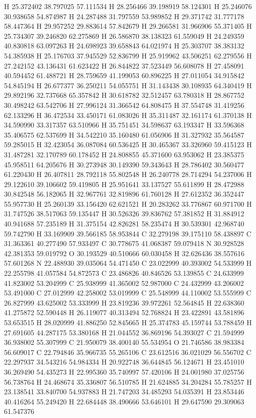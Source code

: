 \documentclass{article}
\begin{document}
H 25.372402 38.797025 57.111534 
H 28.256466 39.198919 58.124301 
H 25.246076 30.938658 54.874987 
H 24.287488 31.797559 53.989852 
H 29.371742 31.777178 58.447364 
H 29.957252 29.883614 57.842679 
H 29.266581 31.966906 55.371405 
H 25.734307 39.246820 62.275869 
H 26.586870 38.138323 61.559049 
H 24.249359 40.830818 63.097263 
H 24.698923 39.658843 64.021974 
H 25.303707 38.383132 54.385938 
H 25.176703 37.945529 52.836799 
H 25.919962 43.506251 62.279556 
H 27.242152 43.136431 61.623422 
H 26.844822 37.523449 56.608078 
H 27.458091 40.594452 61.488721 
H 28.759659 41.199053 60.896225 
H 27.011054 34.915842 54.845194 
H 26.677377 36.250211 54.055751 
H 31.143438 30.108935 64.340419 
H 29.892196 32.737668 65.357842 
H 30.618782 32.512457 63.780318 
H 28.867752 30.498242 63.542706 
H 27.996124 31.366542 64.808475 
H 37.554748 31.419256 62.133296 
H 36.472534 33.450171 61.083026 
H 35.311487 32.161174 61.370138 
H 34.590990 33.317357 63.510966 
H 35.751451 34.598637 63.193347 
H 33.596368 35.406575 62.537699 
H 34.542210 35.160480 61.056906 
H 31.327932 35.564587 59.285015 
H 32.423054 36.087084 60.536425 
H 30.465367 33.326960 59.415123 
H 31.487281 32.170789 60.178452 
H 24.808855 45.371600 63.953062 
H 23.385375 45.958511 64.205676 
H 30.273948 30.149390 59.343643 
H 28.786402 30.560477 61.220430 
H 26.407811 28.792118 55.802548 
H 26.240778 28.714294 54.237006 
H 29.122610 39.106602 59.419805 
H 25.951641 33.137527 55.611899 
H 28.472988 30.842548 56.182065 
H 32.967761 32.819896 61.760128 
H 27.612352 36.352447 55.957730 
H 25.260139 33.156420 62.621521 
H 20.283262 33.776867 60.971700 
H 31.747526 38.517063 59.135447 
H 30.526326 39.836762 57.381852 
H 31.884912 40.941688 57.235189 
H 31.375154 42.826281 58.235474 
H 30.539301 42.968740 59.742790 
H 33.169909 39.566185 58.953844 
C 32.279198 39.175110 58.438897 
C 31.363361 40.277490 57.933497 
C 30.778675 41.068387 59.079418 
N 30.928528 42.381353 59.019792 
O 30.193529 40.510666 60.030458 
H 32.626436 38.557616 57.601268 
N 22.488930 39.035064 54.471450 
C 23.022999 40.393002 54.533999 
H 22.255798 41.057584 54.872573 
C 23.486826 40.846526 53.139855 
C 24.633999 41.823002 53.204999 
C 25.938999 41.365002 52.987000 
C 24.432999 43.206002 53.491000 
C 27.012999 42.258002 53.019999 
C 25.548999 44.110002 53.555999 
C 26.827999 43.625002 53.333999 
H 23.819236 39.972261 52.564845 
H 22.638360 41.275872 52.590448 
H 26.119077 40.313494 52.768824 
H 23.422891 43.581896 53.653515 
H 28.020999 41.886250 52.845665 
H 25.374783 45.159744 53.788459 
H 27.691605 44.287175 53.380168 
H 21.044552 36.869196 54.393027 
C 21.594999 36.938002 55.307999 
C 21.950079 38.400140 55.534954 
O 21.746586 38.983384 56.609017 
C 22.794846 35.966735 55.265106 
C 23.612516 36.021029 56.556702 
C 22.297937 34.543216 54.984334 
H 20.922748 36.644845 56.124671 
H 23.451010 36.269490 54.435273 
H 22.995360 35.740997 57.420106 
H 24.001980 37.025756 56.738764 
H 24.468674 35.336807 56.510785 
H 21.624885 34.204284 55.785257 
H 23.138541 33.840700 54.937883 
H 21.747203 34.485293 54.035391 
H 23.853446 40.416264 55.249420 
H 22.684448 38.490666 53.646101 
H 29.647590 29.309063 61.547376 
~     
    
\end{document}
